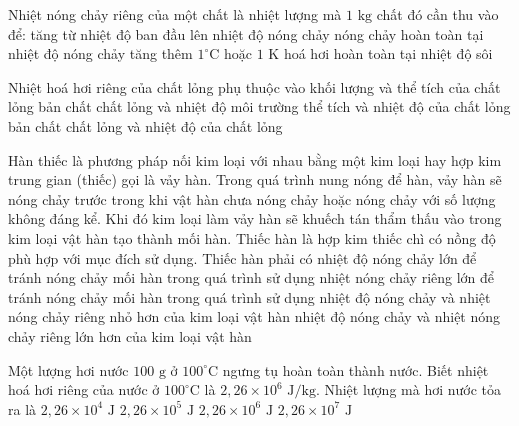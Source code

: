 \begin{ex}
	Nhiệt nóng chảy riêng của một chất là nhiệt lượng mà $1\text{ kg}$ chất đó cần thu vào để:
	\choice
	{tăng từ nhiệt độ ban đầu lên nhiệt độ nóng chảy}
	{\True nóng chảy hoàn toàn tại nhiệt độ nóng chảy}
	{tăng thêm $1^\circ\text{C}$ hoặc $1\text{ K}$}
	{hoá hơi hoàn toàn tại nhiệt độ sôi}
\end{ex}

\begin{ex}
	Nhiệt hoá hơi riêng của chất lỏng phụ thuộc vào
	\choice
	{khối lượng và thể tích của chất lỏng}
	{bản chất chất lỏng và nhiệt độ môi trường}
	{thể tích và nhiệt độ của chất lỏng}
	{\True bản chất chất lỏng và nhiệt độ của chất lỏng}
\end{ex}

\begin{ex}
	Hàn thiếc là phương pháp nối kim loại với nhau bằng một kim loại hay hợp kim trung gian (thiếc) gọi là vảy hàn. Trong quá trình nung nóng để hàn, vảy hàn sẽ nóng chảy trước trong khi vật hàn chưa nóng chảy hoặc nóng chảy với số lượng không đáng kể. Khi đó kim loại làm vảy hàn sẽ khuếch tán thẩm thấu vào trong kim loại vật hàn tạo thành mối hàn. Thiếc hàn là hợp kim thiếc chì có nồng độ phù hợp với mục đích sử dụng. Thiếc hàn phải có
	\choice
	{nhiệt độ nóng chảy lớn để tránh nóng chảy mối hàn trong quá trình sử dụng}
	{nhiệt nóng chảy riêng lớn để tránh nóng chảy mối hàn trong quá trình sử dụng}
	{\True nhiệt độ nóng chảy và nhiệt nóng chảy riêng nhỏ hơn của kim loại vật hàn}
	{nhiệt độ nóng chảy và nhiệt nóng chảy riêng lớn hơn của kim loại vật hàn}
\end{ex}

\begin{ex}
	Một lượng hơi nước $100\text{ g}$ ở $100^\circ\text{C}$ ngưng tụ hoàn toàn thành nước. Biết nhiệt hoá hơi riêng của nước ở $100^\circ\text{C}$ là $2{,}26 \times 10^6\text{ J/kg}$. Nhiệt lượng mà hơi nước tỏa ra là
	\choice
	{$2{,}26 \times 10^4\text{ J}$}
	{\True $2{,}26 \times 10^5\text{ J}$}
	{$2{,}26 \times 10^6\text{ J}$}
	{$2{,}26 \times 10^7\text{ J}$}
\end{ex}

